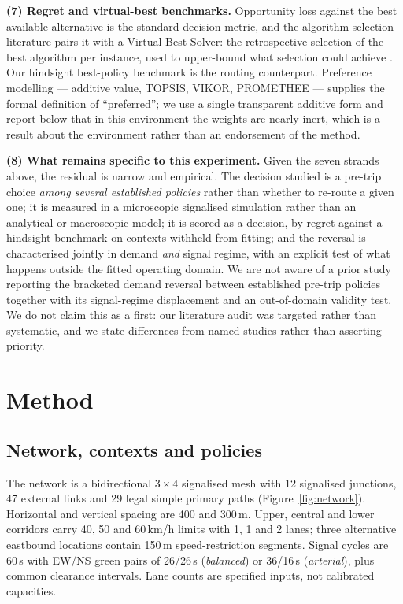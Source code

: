 \documentclass[10pt,a4paper]{article}
\begin{document}
\textbf{(7) Regret and virtual-best benchmarks.} Opportunity loss against the best available alternative \cite{kouvelis1997robust} is the standard decision metric, and the algorithm-selection literature pairs it with a Virtual Best Solver: the retrospective selection of the best algorithm per instance, used to upper-bound what selection could achieve \cite{bischl2016aslib}. Our hindsight best-policy benchmark is the routing counterpart. Preference modelling --- additive value, TOPSIS, VIKOR, PROMETHEE \cite{keeney1993decisions,hwang1981multiple,opricovic2004compromise,brans1985preference} --- supplies the formal definition of ``preferred''; we use a single transparent additive form and report below that in this environment the weights are nearly inert, which is a result about the environment rather than an endorsement of the method.

\textbf{(8) What remains specific to this experiment.} Given the seven strands above, the residual is narrow and empirical. The decision studied is a pre-trip choice \emph{among several established policies} rather than whether to re-route a given one; it is measured in a microscopic signalised simulation rather than an analytical or macroscopic model; it is scored as a decision, by regret against a hindsight benchmark on contexts withheld from fitting; and the reversal is characterised jointly in demand \emph{and} signal regime, with an explicit test of what happens outside the fitted operating domain. We are not aware of a prior study reporting the bracketed demand reversal between established pre-trip policies together with its signal-regime displacement and an out-of-domain validity test. We do not claim this as a first: our literature audit was targeted rather than systematic, and we state differences from named studies rather than asserting priority.

\section{Method}
\subsection{Network, contexts and policies}
The network is a bidirectional $3\times4$ signalised mesh with 12 signalised junctions, 47 external links and 29 legal simple primary paths (Figure~\ref{fig:network}). Horizontal and vertical spacing are 400 and 300\,m. Upper, central and lower corridors carry 40, 50 and 60\,km/h limits with 1, 1 and 2 lanes; three alternative eastbound locations contain 150\,m speed-restriction segments. Signal cycles are 60\,s with EW/NS green pairs of 26/26\,s (\emph{balanced}) or 36/16\,s (\emph{arterial}), plus common clearance intervals. Lane counts are specified inputs, not calibrated capacities.
\end{document}
